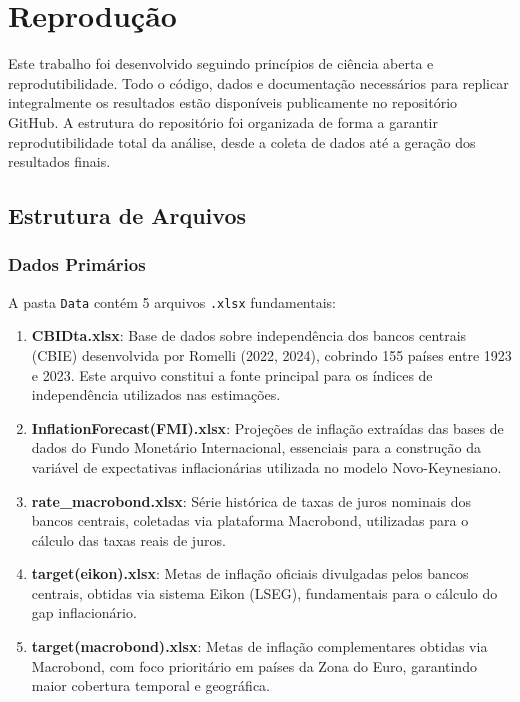 \documentclass[a4paper,12pt]{article}
\begin{document}


\newpage
\printbibliography
{}

\newpage
\section*{Reprodução}


Este trabalho foi desenvolvido seguindo princípios de ciência aberta e reprodutibilidade. Todo o código, dados e documentação necessários para replicar integralmente os resultados estão disponíveis publicamente no repositório GitHub. A estrutura do repositório foi organizada de forma a garantir reprodutibilidade total da análise, desde a coleta de dados até a geração dos resultados finais.

\subsection*{Estrutura de Arquivos}

\subsubsection*{Dados Primários}

A pasta \texttt{Data} contém 5 arquivos \texttt{.xlsx} fundamentais:

\begin{enumerate}
    \item \textbf{CBIDta.xlsx}: Base de dados sobre independência dos bancos centrais (CBIE) desenvolvida por Romelli (2022, 2024), cobrindo 155 países entre 1923 e 2023. Este arquivo constitui a fonte principal para os índices de independência utilizados nas estimações.
    
    \item \textbf{InflationForecast(FMI).xlsx}: Projeções de inflação extraídas das bases de dados do Fundo Monetário Internacional, essenciais para a construção da variável de expectativas inflacionárias utilizada no modelo Novo-Keynesiano.
    
    \item \textbf{rate\_macrobond.xlsx}: Série histórica de taxas de juros nominais dos bancos centrais, coletadas via plataforma Macrobond, utilizadas para o cálculo das taxas reais de juros.
    
    \item \textbf{target(eikon).xlsx}: Metas de inflação oficiais divulgadas pelos bancos centrais, obtidas via sistema Eikon (LSEG), fundamentais para o cálculo do gap inflacionário.
    
    \item \textbf{target(macrobond).xlsx}: Metas de inflação complementares obtidas via Macrobond, com foco prioritário em países da Zona do Euro, garantindo maior cobertura temporal e geográfica.
\end{enumerate}
\end{document}
